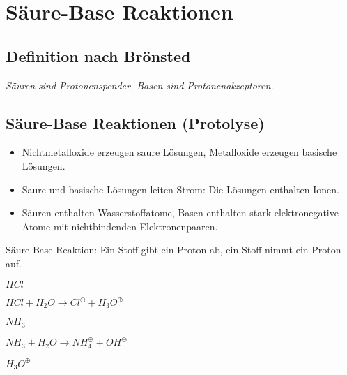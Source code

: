\section{Säure-Base Reaktionen}

\subsection{Definition nach Brönsted}

\textit{Säuren sind Protonenspender, Basen sind Protonenakzeptoren.}

\subsection{Säure-Base Reaktionen (Protolyse)}

\begin{itemize}
	\item Nichtmetalloxide erzeugen saure Lösungen, Metalloxide erzeugen basische Lösungen.
	\item Saure und basische Lösungen leiten Strom: Die Lösungen enthalten Ionen.
	\item Säuren enthalten Wasserstoffatome, Basen enthalten stark elektronegative Atome mit nichtbindenden Elektronenpaaren.
\end{itemize}

\begin{definition}[Protolyse]
	Säure-Base-Reaktion: Ein Stoff gibt ein Proton ab, ein Stoff nimmt ein Proton auf.
\end{definition}

\begin{definition}
	{\large
	$HCl$
}
\end{definition}

\begin{definition}
	{\large
		$HCl + H_2O \rightarrow Cl^\ominus + H_3O^\oplus$
	}
\end{definition}

\begin{definition}
	{\large
		$NH_3$
	}
\end{definition}

\begin{definition}
	{\large
		 $NH_3 + H_2O \rightarrow NH_4^\oplus + OH^\ominus$
	}
\end{definition}

\begin{definition}
	{\large
		$H_3O^\oplus$
	}
\end{definition}

